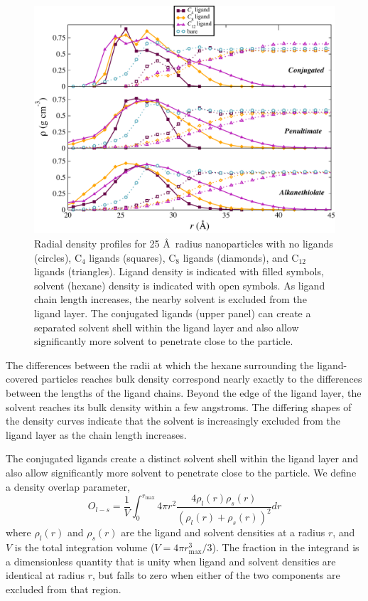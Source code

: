 \documentclass[aps,jcp,preprint,showpacs,superscriptaddress,groupedaddress]{revtex4-1}  %
\begin{document}
\begin{figure}
  \includegraphics[width=\linewidth]{figures/density}
  \caption{Radial density profiles for 25 \AA\ radius nanoparticles
    with no ligands (circles), C$_{4}$ ligands (squares), C$_{8}$
    ligands (diamonds), and C$_{12}$ ligands (triangles). Ligand
    density is indicated with filled symbols, solvent (hexane) density
    is indicated with open symbols. As ligand chain length increases,
    the nearby solvent is excluded from the ligand layer.  The
    conjugated ligands (upper panel) can create a separated solvent
    shell within the ligand layer and also allow significantly more
    solvent to penetrate close to the particle.}
  \label{fig:density}
\end{figure}

The differences between the radii at which the hexane surrounding the
ligand-covered particles reaches bulk density correspond nearly
exactly to the differences between the lengths of the ligand
chains. Beyond the edge of the ligand layer, the solvent reaches its
bulk density within a few angstroms. The differing shapes of the
density curves indicate that the solvent is increasingly excluded from
the ligand layer as the chain length increases.

The conjugated ligands create a distinct solvent shell within the
ligand layer and also allow significantly more solvent to penetrate
close to the particle.  We define a density overlap parameter,
\begin{equation}
O_{l-s} = \frac{1}{V} \int_0^{r_\mathrm{max}} 4 \pi r^2 \frac{4 \rho_l(r) \rho_s(r)}{\left(\rho_l(r) +
    \rho_s(r)\right)^2} dr
\end{equation}
where $\rho_l(r)$ and $\rho_s(r)$ are the ligand and solvent densities
at a radius $r$, and $V$ is the total integration volume
($V = 4\pi r_\mathrm{max}^3 / 3$).  The fraction in the integrand is a
dimensionless quantity that is unity when ligand and solvent densities
are identical at radius $r$, but falls to zero when either of the two
components are excluded from that region.
\end{document}
